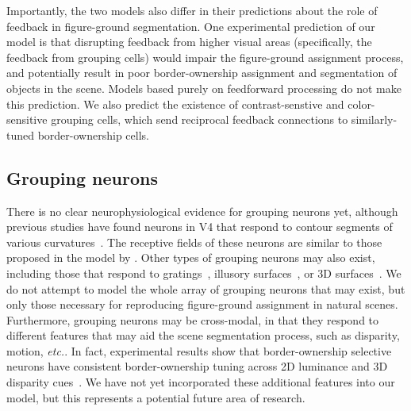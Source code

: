 \documentclass[12pt]{article}
\newcommand{\etc}[0]{{\em etc.}\xspace}
\begin{document}
Importantly, the two models also differ in their predictions about the role of feedback in figure-ground segmentation. One experimental prediction of our model is that disrupting feedback from higher visual areas (specifically, the feedback from grouping cells) would impair the figure-ground assignment process, and potentially result in poor border-ownership assignment and segmentation of objects in the scene. Models based purely on feedforward processing do not make this prediction. We also predict the existence of contrast-senstive and color-sensitive grouping cells, which send reciprocal feedback connections to similarly-tuned border-ownership cells.

\subsection{Grouping neurons}
There is no clear neurophysiological evidence for
grouping neurons yet,
although previous studies have found neurons in V4 
that respond to contour segments
of various curvatures~\citep{Pasupathy_Connor02,Brincat_Connor04}. The receptive fields of these neurons are
similar to those proposed in the model by
\cite{Craft_etal07}. Other types of grouping neurons may also exist,
including those that respond to 
gratings~\citep{Hegde_vanEssen07}, illusory
surfaces~\citep{Cox_etal13}, or 3D
surfaces~\citep{He_Nakayama95,Hu_etal15a}.
We do not attempt to model the whole array of grouping neurons that may exist, but
only those necessary for reproducing figure-ground assignment in natural scenes. Furthermore, grouping neurons may be cross-modal, in that they respond to different features that may aid the scene segmentation process, such as disparity, motion, \etc. In fact, experimental results show that border-ownership selective neurons have consistent border-ownership tuning across 2D luminance and 3D disparity cues~\citep{Qiu_etal05}. We have not yet incorporated these additional features into our model, but this represents a potential future area of research.
\end{document}
